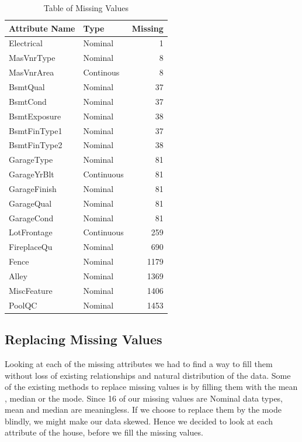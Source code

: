 \documentclass[fleqn,10pt]{SelfArx} %
\begin{document}
	\begin{table}[hbt]
		\caption{Table of Missing Values}
		\centering
		\begin{tabular}{llr}
			\cmidrule(r){1-2}
			Attribute Name &  Type & Missing \\
			\midrule
			Electrical & Nominal & 1 \\
			MasVnrType & Nominal & 8 \\
			MasVnrArea & Continous & 8 \\
			BsmtQual & Nominal & 37 \\
			BsmtCond & Nominal & 37 \\
			BsmtExposure & Nominal & 38 \\
			BsmtFinType1 & Nominal & 37 \\
			BsmtFinType2 & Nominal & 38 \\
			GarageType & Nominal & 81 \\
			GarageYrBlt & Continuous & 81 \\ 
			GarageFinish & Nominal & 81 \\
			GarageQual & Nominal & 81 \\
			GarageCond & Nominal & 81 \\
			LotFrontage & Continuous & 259 \\
			FireplaceQu & Nominal & 690 \\
			Fence & Nominal & 1179 \\
			Alley & Nominal & 1369 \\
			MiscFeature & Nominal & 1406 \\
			PoolQC & Nominal & 1453 \\	
		\end{tabular}
		\label{tab:label}
	\end{table}

	\subsection{Replacing Missing Values}
	Looking at each of the missing attributes we had to find a way to fill them without loss of existing relationships and natural distribution of the data. Some of the existing methods to replace missing values is by filling them with the mean , median or the mode. Since 16 of our missing values are Nominal data types, mean and median are meaningless. If we choose to replace them by the mode blindly, we might make our data skewed. Hence we decided to look at each attribute of the house, before we fill the missing values. \\
	
\end{document}
